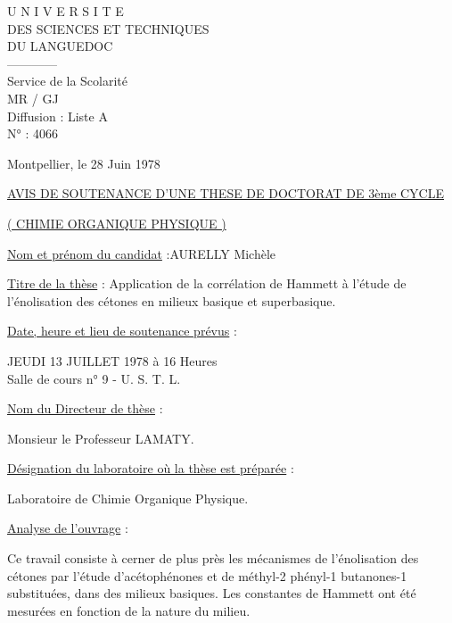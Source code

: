 \begin{minipage}{.45\linewidth}\centering
U N I V E R S I T E\\
DES SCIENCES ET TECHNIQUES\\
DU LANGUEDOC\\
------------\\
Service de la Scolarité\\
MR / GJ\\
Diffusion : Liste A\\
N° : 4066
\end{minipage}\hfill
\begin{minipage}{.48\linewidth}
Montpellier, le 28 Juin 1978
\end{minipage}

\begin{center}
\uline{AVIS DE SOUTENANCE D'UNE THESE DE DOCTORAT DE 3ème CYCLE}

\uline{( CHIMIE ORGANIQUE PHYSIQUE )}
\end{center}

\uline{Nom et prénom du candidat} :\qquad AURELLY Michèle

\uline{Titre de la thèse} : Application de la corrélation de Hammett à l'étude de
l'énolisation des cétones en milieux basique et superbasique.

\uline{Date, heure et lieu de soutenance prévus} :
\begin{flushright}
JEUDI 13 JUILLET 1978 à 16 Heures\\
Salle de cours n° 9 - U. S. T. L.
\end{flushright}

\uline{Nom du Directeur de thèse} :
\begin{flushright}Monsieur le Professeur LAMATY.\end{flushright}

\uline{Désignation du laboratoire où la thèse est préparée} :
\begin{flushright}Laboratoire de Chimie Organique Physique.\end{flushright}

\uline{Analyse de l'ouvrage} :

Ce travail consiste à cerner de plus près
les mécanismes de l'énolisation des cétones par l'étude d'acétophénones et
de méthyl-2 phényl-1 butanones-1 substituées, dans des milieux basiques.
Les constantes  de Hammett ont été mesurées en fonction de la nature du milieu.

